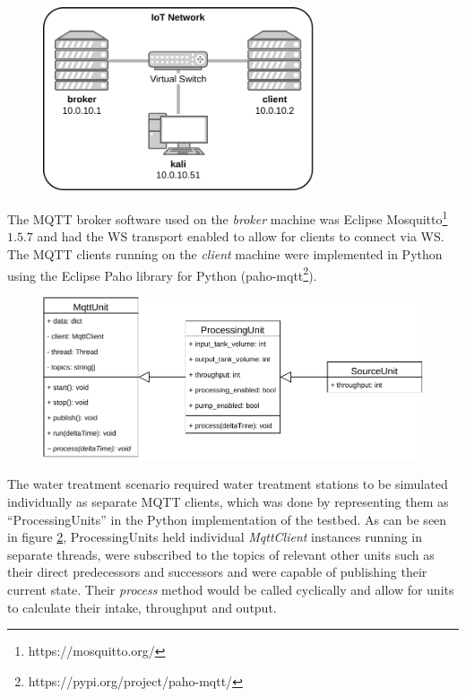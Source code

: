 \begin{figure}[h]
    \centering
    \includegraphics[width=8cm]{img/ch04/Testbed2.pdf}
    \label{fig:testbed-network}
\end{figure}
The \ac{MQTT} broker software used on the \emph{broker} machine was Eclipse Mosquitto\footnote{https://mosquitto.org/} $1.5.7$ and had the \ac{WS} transport enabled to allow for clients to connect via \ac{WS}. The \ac{MQTT} clients running on the \emph{client} machine were implemented in Python using the Eclipse Paho library for Python (paho-mqtt\footnote{https://pypi.org/project/paho-mqtt/}).\par %
\begin{figure}[h]
    \centering
    \includegraphics[width=14cm]{img/ch04/Testbed-Unit.pdf}
    \label{fig:testbed-unit}
\end{figure}
The water treatment scenario required water treatment stations to be simulated individually as separate \ac{MQTT} clients, which was done by representing them as \enquote{ProcessingUnits} in the Python implementation of the testbed. As can be seen in figure \ref{fig:testbed-unit}, ProcessingUnits held individual \emph{MqttClient} instances running in separate threads, were subscribed to the topics of relevant other units such as their direct predecessors and successors and were capable of publishing their current state. Their \emph{process} method would be called cyclically and allow for units to calculate their intake, throughput and output.

